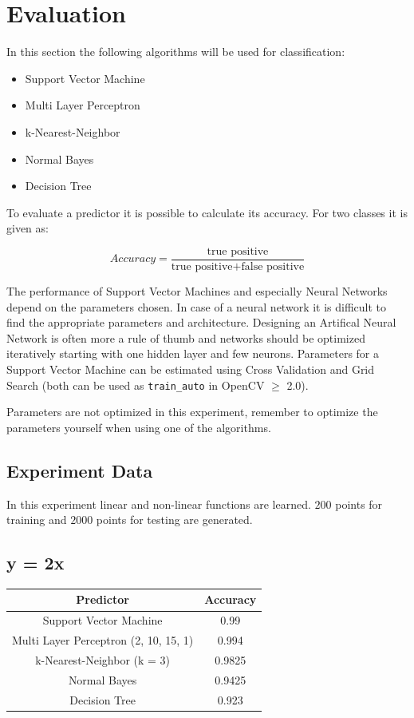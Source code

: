 \section{Evaluation}
In this section the following algorithms will be used for classification:
\begin{itemize}
 \item Support Vector Machine
 \item Multi Layer Perceptron
 \item k-Nearest-Neighbor
 \item Normal Bayes
 \item Decision Tree
\end{itemize}

To evaluate a predictor it is possible to calculate its accuracy. For two classes it is given as:

$$Accuracy = \frac{\mbox{true positive}}{\mbox{true positive} + \mbox{false positive}}$$

The performance of Support Vector Machines and especially Neural Networks depend on the parameters chosen. In case of a neural network it is difficult to find the appropriate parameters and architecture. Designing an Artifical Neural Network is often more a rule of thumb and networks should be optimized iteratively starting with one hidden layer and few neurons. Parameters for a Support Vector Machine can be estimated using Cross Validation and Grid Search (both can be used as \lstinline|train_auto| in OpenCV $\geq$ 2.0).
 
Parameters are not optimized in this experiment, remember to optimize the parameters yourself when using one of the algorithms.

\subsection{Experiment Data}
In this experiment linear and non-linear functions are learned. $200$ points for training and $2000$ points for testing are generated.

\subsection{y = 2x}

\begin{tabular}{|c|c|}
\hline
Predictor &	 Accuracy\\ \hline\hline
Support Vector Machine &	0.99\\ \hline
Multi Layer Perceptron (2, 10, 15, 1) & 0.994\\ \hline
k-Nearest-Neighbor (k = 3) & 0.9825\\ \hline
Normal Bayes &	0.9425 \\ \hline
Decision Tree &	0.923\\ \hline
\end{tabular}

